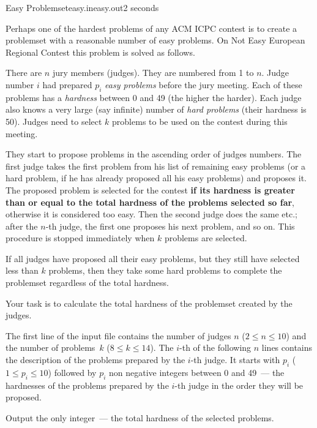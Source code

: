 \begin{problem}{Easy Problemset}{easy.in}{easy.out}{2 seconds}


Perhaps one of the hardest problems of any ACM ICPC contest is to create a problemset with a reasonable number of easy problems.
On Not Easy European Regional Contest 
this problem is solved as follows.

There are $n$ jury members (judges). They are numbered from 1 to $n$. Judge number $i$
had prepared $p_i$ \emph{easy problems} before the jury meeting. Each of these problems has a \emph{hardness} between
0 and 49 (the higher the harder). Each judge also knows a very large (say infinite) number of \emph{hard problems}
(their hardness is 50). Judges need to select $k$ problems to be used on the contest during this meeting.

They start to propose problems in the ascending order of judges numbers. The first judge takes the first problem from his list
of remaining easy problems (or a hard problem, if he has already proposed all his easy problems)
and proposes it. The proposed problem is selected for the contest
\textbf{if its hardness is greater than or equal to the total hardness of the problems selected so far},
otherwise it is considered too easy. Then the second judge does the same etc.; after
the $n$-th judge, the first one proposes his next problem, and so on. This procedure is stopped immediately when $k$ problems
are selected.

If all judges have proposed all their easy problems, but they still have selected less than $k$ problems, then 
they take some hard problems to complete the problemset regardless of the total hardness.

Your task is to calculate the total hardness of the problemset created by the judges.

\InputFile

The first line of the input file contains the number of judges $n$ ($2 \le n \le 10$) and the number of
problems~$k$ ($8 \le k \le 14$). The $i$-th of the following $n$ lines contains the description of the problems prepared
by the $i$-th judge. It starts with $p_i$ ($1\le p_i\le 10$) followed by $p_i$ non negative integers between
0 and 49~--- the hardnesses of the problems prepared by the $i$-th judge in the order they will be proposed.

\OutputFile

Output the only integer~--- the total hardness of the selected problems.


\end{problem}
